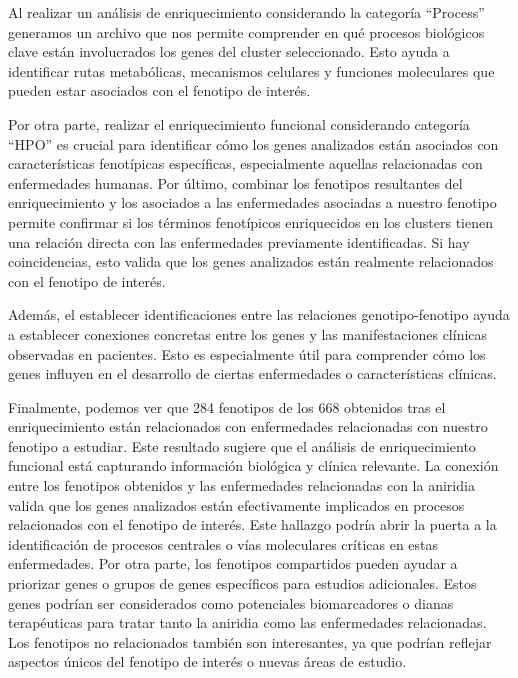 Al realizar un análisis de enriquecimiento considerando la categoría “Process” generamos un archivo que nos permite comprender en qué procesos biológicos clave están involucrados los genes del cluster seleccionado. Esto ayuda a identificar rutas metabólicas, mecanismos celulares y funciones moleculares que pueden estar asociados con el fenotipo de interés.

Por otra parte, realizar el enriquecimiento funcional considerando categoría “HPO” es crucial para identificar cómo los genes analizados están asociados con características fenotípicas específicas, especialmente aquellas relacionadas con enfermedades humanas. 
Por último, combinar los fenotipos resultantes del enriquecimiento y los asociados a las enfermedades asociadas a nuestro fenotipo permite confirmar si los términos fenotípicos enriquecidos en los clusters tienen una relación directa con las enfermedades previamente identificadas. Si hay coincidencias, esto valida que los genes analizados están realmente relacionados con el fenotipo de interés.

Además, el establecer identificaciones entre las relaciones genotipo-fenotipo ayuda a establecer conexiones concretas entre los genes y las manifestaciones clínicas observadas en pacientes. Esto es especialmente útil para comprender cómo los genes influyen en el desarrollo de ciertas enfermedades o características clínicas.

Finalmente, podemos ver que 284 fenotipos de los 668 obtenidos tras el enriquecimiento están relacionados con enfermedades relacionadas con nuestro fenotipo a estudiar. Este resultado sugiere que el análisis de enriquecimiento funcional está capturando información biológica y clínica relevante. La conexión entre los fenotipos obtenidos y las enfermedades relacionadas con la aniridia valida que los genes analizados están efectivamente implicados en procesos relacionados con el fenotipo de interés. Este hallazgo podría abrir la puerta a la identificación de procesos centrales o vías moleculares críticas en estas enfermedades.
Por otra parte,  los fenotipos compartidos pueden ayudar a priorizar genes o grupos de genes específicos para estudios adicionales. Estos genes podrían ser considerados como potenciales biomarcadores o dianas terapéuticas para tratar tanto la aniridia como las enfermedades relacionadas.
Los fenotipos no relacionados también son interesantes, ya que podrían reflejar aspectos únicos del fenotipo de interés o nuevas áreas de estudio.





